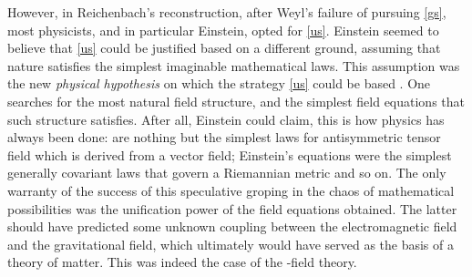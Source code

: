 \documentclass[draft]{article}
\newcommand{\FP}{\german{Fernparallelismus}\xspace}
\begin{document}
However, in Reichenbach's reconstruction, after Weyl's failure of pursuing \cref{gs}, most physicists, and in particular Einstein, opted for \cref{us}. Einstein seemed to believe that \cref{us} could be justified based on a different ground, assuming that nature satisfies the simplest imaginable mathematical laws. This assumption was the new \emph{physical hypothesis} on which the strategy \cref{us} could be based \citep[see][\S50]{Reichenbach1928}. One searches for the most natural field structure, and the simplest field equations that such structure satisfies. After all, Einstein could claim, this is how physics has always been done: \ME are nothing but the simplest laws for antisymmetric tensor field \Fmn which is derived from a vector field; Einstein's equations were the simplest generally covariant laws that govern a Riemannian metric \gmn and so on. The only warranty of the success of this speculative groping in the chaos of mathematical possibilities was the unification power of the field equations obtained. The latter should have predicted some unknown coupling between the electromagnetic field and the gravitational field, which ultimately would have served as the basis of a theory of matter. This was indeed the case of the \FP-field theory. 


\end{document}
